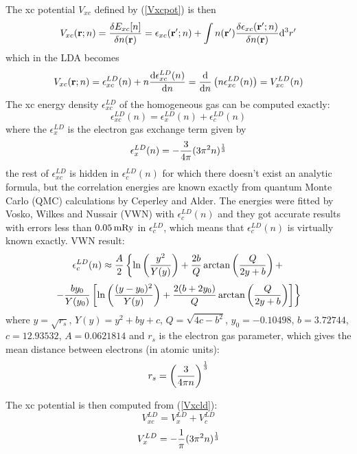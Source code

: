 The xc potential $V_{xc}$ defined by (\ref{Vxcpot}) is then 
\begin{equation*}
  V_{xc}({\bf r};n)={\delta E_{xc}[n]\over\delta n({\bf r})}= \epsilon_{xc}({\bf r}';n)+ \int n({\bf r}'){\delta \epsilon_{xc}({\bf r}';n)\over\delta n({\bf r})}{\rm d}^3r'
\end{equation*}
which in the LDA becomes 
\begin{equation}
  V_{xc}({\bf r};n) =\epsilon_{xc}^{LD}(n)+n{{\rm d} \epsilon_{xc}^{LD}(n)\over {\rm d} n}= {{\rm d} \over {\rm d} n}\left(n\epsilon_{xc}^{LD}(n)\right)= V_{xc}^{LD}(n)  \label{Vxcld}
\end{equation}
The xc energy density $\epsilon_{xc}^{LD}$ of the homogeneous gas can be computed exactly\cite{martin}: 
\begin{equation*}
  \epsilon_{xc}^{LD}(n)=\epsilon_x^{LD}(n)+\epsilon_c^{LD}(n)
\end{equation*}
where the $\epsilon_x^{LD}$ is the electron gas exchange term given by\cite{martin} 
\begin{equation*}
  \epsilon_x^{LD}(n)=-{3\over4\pi}(3\pi^2 n)^{1\over3}
\end{equation*}
the rest of $\epsilon_{xc}^{LD}$ is hidden in $\epsilon_c^{LD}(n)$ for which there doesn't exist an analytic formula, but the correlation energies are known exactly from quantum Monte Carlo (QMC) calculations by Ceperley and Alder\cite{pickett}. The energies were fitted by Vosko, Wilkes and Nussair (VWN) with $\epsilon_c^{LD}(n)$ and they got accurate results with errors less than $0.05\rm\,mRy$ in $\epsilon_c^{LD}$, which means that $\epsilon_c^{LD}(n)$ is virtually known exactly. VWN result: 
\begin{equation*}
  \epsilon_c^{LD}(n)\approx {A\over2}\left\{ \ln\left(y^2\over Y(y)\right)+{2b\over Q}\arctan\left(Q\over 2y+b\right)+ \right.
\end{equation*}
\begin{equation*}
  \left. -{by_0\over Y(y_0)}\left[\ln\left((y-y_0)^2\over Y(y)\right) +{2(b+2y_0)\over Q}\arctan\left(Q\over 2y+b\right) \right] \right\}
\end{equation*}
where $y=\sqrt{r_s}$, $Y(y)=y^2+by+c$, $Q=\sqrt{4c-b^2}$, $y_0=-0.10498$, $b=3.72744$, $c=12.93532$, $A=0.0621814$ and $r_s$ is the electron gas parameter, which gives the mean distance between electrons (in atomic units): 
\begin{equation*}
  r_s=\left(3\over4\pi n\right)^{1\over3}
\end{equation*}

The xc potential is then computed from (\ref{Vxcld}): 
\begin{equation*}
  V_{xc}^{LD}=V_x^{LD}+V_c^{LD}
\end{equation*}
\begin{equation*}
  V_x^{LD}=-{1\over\pi}(3\pi^2 n)^{1\over3}
\end{equation*}


